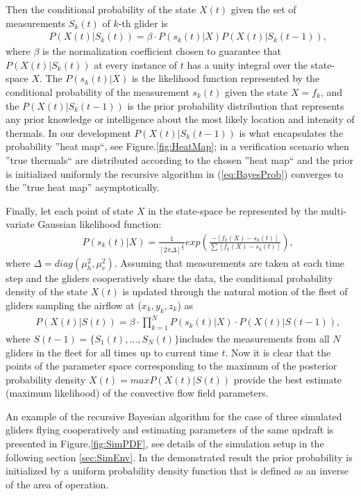 \documentclass{ifacconf}
\begin{document}
Then the conditional probability of the state $X(t)$ given the set of measurements $S_k(t)$ of $k$-th glider is
\begin{eqnarray}
    && P(X(t)\vert S_k(t))=\beta \cdot P(s_k(t) \vert X)P(X(t) \vert S_k(t-1)),
    \label{eq:BayesProb}
\end{eqnarray}
where $\beta$ is the normalization coefficient chosen to guarantee that $P(X(t)\vert S_k(t))$ at every instance of $t$ has a unity integral over the state-space $X$.  The $P(s_k(t) \vert X)$ is the likelihood function represented by the conditional probability of the measurement $s_k(t)$ given the state $X=f_k$, and the $P(X(t) \vert S_k(t-1))$ is the prior probability distribution that represents any prior knowledge or intelligence about the most likely location and intensity of thermals. In our development $P(X(t) \vert S_k(t-1))$ is what encapsulates the probability ''heat map``, see Figure.\ref{fig:HeatMap}; in a verification scenario when ''true thermals`` are distributed according to the chosen ''heat map`` and the prior is initialized uniformly the recursive algorithm in (\ref{eq:BayesProb}) converges   to the ''true heat map'' asymptotically.

Finally, let each point of state $X$ in the state-space be represented by the multi-variate Gaussian likelihood function:
\begin{eqnarray*}
    && P(s_k(t)\vert X)=\frac{1}{[2\pi \Delta]^\frac{1}{2}}  exp( \frac{-[f_k(X)-s_k(t)]}{\sum [f_k(X)-s_k(t)] }),
    \label{eq:BayesLikeLH}
\end{eqnarray*}
where $\Delta=diag(\mu^2_h,\mu^2_v)$. Assuming that measurements are taken at each time step and the gliders cooperatively share the data, the conditional probability density of the state $X(t)$ is updated through the natural motion of the fleet of gliders sampling the airflow at ($x_k,y_k,z_k$) as
\begin{eqnarray*}
    && P(X(t)\vert S(t))=\beta \cdot \prod_{k=1}^N P(s_k(t) \vert X)\cdot P(X(t) \vert S(t-1)),
    \label{eq:CondProb}
\end{eqnarray*}
where $S(t-1)=\{ S_1(t),...,S_N(t)\} $includes the measurements from all $N$ gliders in the fleet for all times up to current time $t$. Now it is clear that the points of the parameter space corresponding to the maximum of the posterior probability density $X(t)=max P(X(t) \vert S(t))$ provide the best estimate (maximum likelihood) of the convective flow field parameters.

An example of the recursive Bayesian algorithm for the case of three simulated gliders flying
cooperatively and estimating parameters of the same updraft is presented in Figure.\ref{fig:SimPDF}, see details of the simulation setup in the following section \ref{sec:SimEnv}. In the demonstrated result the prior probability is initialized by a uniform probability density function that is defined as an inverse of the area of operation.
\end{document}
